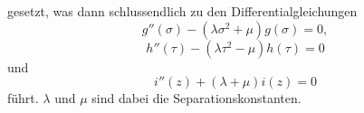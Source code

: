 gesetzt, was dann schlussendlich zu den Differentialgleichungen 
\begin{equation}\label{parzyl:sep_dgl_1}
	g''(\sigma) 
	- 
	\left (
	\lambda\sigma^2
	+
	\mu 
	\right )
	g(\sigma)
	=
	0,
\end{equation}
\begin{equation}\label{parzyl:sep_dgl_2}
	h''(\tau) 
	- 
	\left (
	\lambda\tau^2
	-
	\mu 
	\right )
	h(\tau)
	=
	0
\end{equation}
und
\begin{equation}\label{parzyl:sep_dgl_3}
	i''(z) 
	+
	\left (
	\lambda
	+
	\mu 
	\right )
	i(z)
	=
	0
\end{equation}
führt. $\lambda$ und $\mu$ sind dabei die Separationskonstanten. 




